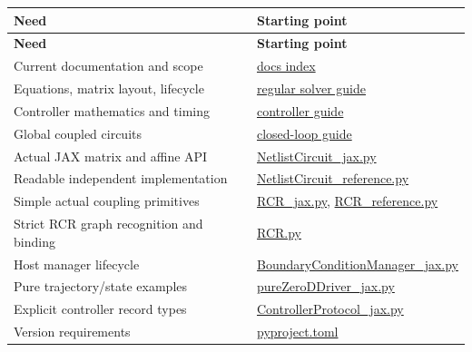 \documentclass[11pt,a4paper]{article}
\begin{document}
\begingroup\footnotesize
\setlength{\tabcolsep}{4pt}
\begin{longtable}{>{\raggedright\arraybackslash}p{}>{\raggedright\arraybackslash}p{}}
\toprule
\textbf{Need} & \textbf{Starting point} \\
\midrule
\endfirsthead
\textbf{Need} & \textbf{Starting point} \\
\midrule
\endhead
\bottomrule
\endfoot
Current documentation and scope & \href{/home/sadid/crimson/cfs_reg/CRIMSONFlowsolver/flowsolver/netlist_py/docs/README.md}{docs index} \\
Equations, matrix layout, lifecycle & \href{/home/sadid/crimson/cfs_reg/CRIMSONFlowsolver/flowsolver/netlist_py/docs/NETLIST_SOLVER_DEVELOPER_GUIDE.md}{regular solver guide} \\
Controller mathematics and timing & \href{/home/sadid/crimson/cfs_reg/CRIMSONFlowsolver/flowsolver/netlist_py/docs/CONTROLLER_ARCHITECTURE_TEACHING_GUIDE.md}{controller guide} \\
Global coupled circuits & \href{/home/sadid/crimson/cfs_reg/CRIMSONFlowsolver/flowsolver/netlist_py/docs/closed_loop_lifecycle.md}{closed-loop guide} \\
Actual JAX matrix and affine API & \href{/home/sadid/crimson/cfs_reg/CRIMSONFlowsolver/flowsolver/netlist_py/src/NetlistCircuit_jax.py}{NetlistCircuit\_jax.py} \\
Readable independent implementation & \href{/home/sadid/crimson/cfs_reg/CRIMSONFlowsolver/flowsolver/netlist_py/src/NetlistCircuit_reference.py}{NetlistCircuit\_reference.py} \\
Simple actual coupling primitives & \href{/home/sadid/crimson/cfs_reg/CRIMSONFlowsolver/flowsolver/netlist_py/src/RCR_jax.py}{RCR\_jax.py}, \href{/home/sadid/crimson/cfs_reg/CRIMSONFlowsolver/flowsolver/netlist_py/src/RCR_reference.py}{RCR\_reference.py} \\
Strict RCR graph recognition and binding & \href{/home/sadid/crimson/cfs_reg/CRIMSONFlowsolver/flowsolver/netlist_py/src/RCR.py}{RCR.py} \\
Host manager lifecycle & \href{/home/sadid/crimson/cfs_reg/CRIMSONFlowsolver/flowsolver/netlist_py/src/BoundaryConditionManager_jax.py}{BoundaryConditionManager\_jax.py} \\
Pure trajectory/state examples & \href{/home/sadid/crimson/cfs_reg/CRIMSONFlowsolver/flowsolver/netlist_py/src/pureZeroDDriver_jax.py}{pureZeroDDriver\_jax.py} \\
Explicit controller record types & \href{/home/sadid/crimson/cfs_reg/CRIMSONFlowsolver/flowsolver/netlist_py/src/ControllerProtocol_jax.py}{ControllerProtocol\_jax.py} \\
Version requirements & \href{/home/sadid/crimson/cfs_reg/CRIMSONFlowsolver/flowsolver/netlist_py/pyproject.toml}{pyproject.toml} \\
\end{longtable}
\endgroup
\clearpage
\end{document}

